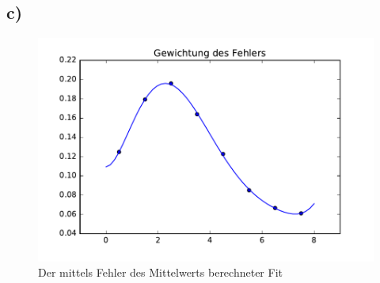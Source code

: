 \subsection*{c)}

\begin{figure}
  \centering
  \includegraphics[width=\textwidth]{./Python/gewichtung.pdf}
  \caption{Der mittels Fehler des Mittelwerts berechneter Fit}
\end{figure}
